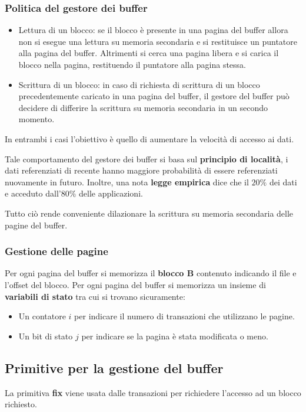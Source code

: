 \documentclass[oneside,a4paper,11pt]{book}
\theoremstyle{italicstyle}
\theoremstyle{normStyle}
\begin{document}
\subsubsection{Politica del gestore dei buffer}
\begin{itemize}
    \item Lettura di un blocco: se il blocco è presente in una pagina del buffer 
    allora non si esegue una lettura su memoria secondaria e si restituisce un puntatore 
    alla pagina del buffer. Altrimenti si cerca una pagina libera e si carica il blocco nella 
    pagina, restituendo il puntatore alla pagina stessa.
    \item Scrittura di un blocco: in caso di richiesta di scrittura 
    di un blocco precedentemente caricato in una pagina del buffer, il gestore del buffer può 
    decidere di differire la scrittura su memoria secondaria in un secondo momento.
\end{itemize}
In entrambi i casi l'obiettivo è quello di aumentare la velocità di 
accesso ai dati.

Tale comportamento del gestore dei buffer si basa sul \textbf{principio di località},
i dati referenziati di recente hanno maggiore probabilità di essere referenziati 
nuovamente in futuro.
Inoltre, una nota \textbf{legge empirica} dice che il $20\%$ dei dati e acceduto 
dall'$80\%$ delle applicazioni. 

Tutto ciò rende conveniente dilazionare la scrittura su memoria secondaria 
delle pagine del buffer.
\subsubsection{Gestione delle pagine}
Per ogni pagina del buffer si memorizza il \textbf{blocco B} contenuto 
indicando il file e l'offset del blocco. Per ogni pagina del buffer si memorizza un insieme di 
\textbf{variabili di stato} tra cui si trovano sicuramente:
\begin{itemize}
    \item Un contatore $i$ per indicare il numero di transazioni che utilizzano 
    le pagine.
    \item Un bit di stato $j$ per indicare se la pagina è stata modificata o meno.
\end{itemize}
\subsection{Primitive per la gestione del buffer}

La primitiva \textbf{fix} viene usata dalle transazioni per richiedere l'accesso 
ad un blocco richiesto.
\end{document}
